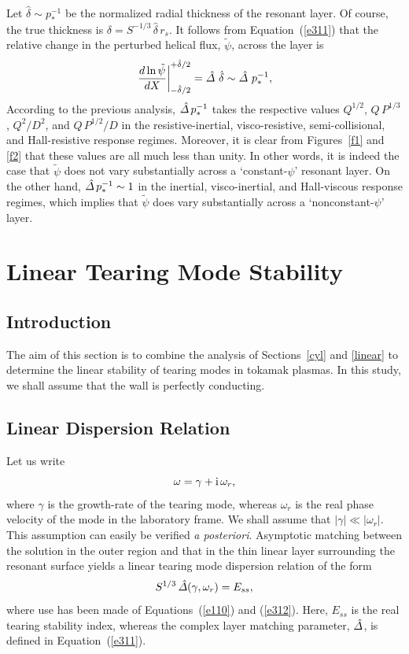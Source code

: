 \documentclass[notitlepage,12pt]{article}
\begin{document}
Let $\hat{\delta}\sim p_\ast^{-1}$ be the normalized radial thickness of the resonant layer.  Of course, the true thickness is
$\delta = S^{-1/3}\,\hat{\delta}\,r_s$.  It follows from
Equation~(\ref{e311}) that the relative change in the perturbed helical flux, $\tilde{\psi}$, across the layer
is
\begin{equation}
\left.\frac{d\ln\tilde{\psi}}{dX}\right|_{-\hat{\delta}/2}^{+\hat{\delta}/2} = \hat{\mit\Delta}\,\,\hat{\delta}\sim \hat{\mit\Delta}\,\,p_\ast^{-1},
\end{equation}
According to the previous analysis, $\hat{\mit\Delta}\,p_\ast^{-1}$ takes the respective values $Q^{1/2}$, $Q\,P^{1/3}$, 
$Q^2/D^2$, and $Q\,P^{1/2}/D$ in the resistive-inertial, visco-resistive, semi-collisional, and
Hall-resistive response regimes. Moreover, it is clear from Figures~\ref{f1} and \ref{f2} that these values are all
much less than unity. In other words, it is indeed the case that $\tilde{\psi}$ does not vary substantially across a
`constant-$\psi$' resonant layer. On the other hand, $\hat{\mit\Delta}\,p_\ast^{-1}\sim 1$ in the inertial,
visco-inertial, and Hall-viscous response regimes, which implies that $\tilde{\psi}$ does vary substantially
across a `nonconstant-$\psi$' layer. 

\section{Linear Tearing Mode Stability}
\subsection{Introduction}
The aim of this section is to combine the analysis of Sections~\ref{cyl} and \ref{linear} to determine the linear stability
of tearing modes in tokamak plasmas. In this study, we shall assume that the wall is perfectly conducting. 

\subsection{Linear Dispersion Relation}\label{s6.2}
Let us write
\begin{equation}\label{e350}
\omega = \gamma+{\rm i}\,\omega_r,
\end{equation}
where $\gamma$ is the growth-rate of the tearing mode, whereas $\omega_r$ is the real
phase velocity of the mode in the laboratory frame. We shall assume that $|\gamma|\ll |\omega_r|$. This assumption can
easily be verified {\em a posteriori}. Asymptotic matching between the solution in the outer region and that in the
thin linear layer surrounding the resonant surface yields a linear tearing mode dispersion relation of the form
\begin{equation}\label{e352}
S^{1/3}\,\hat{\mit\Delta}(\gamma,\omega_r) = E_{ss},
\end{equation}
where use has been made of Equations~(\ref{e110}) and (\ref{e312}). Here, $E_{ss}$ is the real tearing stability index, 
whereas the complex layer matching parameter, $\hat{\mit\Delta}$, is defined in Equation~(\ref{e311}). 
\end{document}
